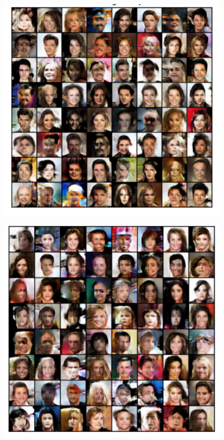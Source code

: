 \documentclass[12pt]{article}
\begin{document}
\begin{figure}[h]
    \centering
    \begin{minipage}{0.45\textwidth}
        \centering
        \includegraphics[width=\textwidth]{15.png} 
        \label{fig:resim1}
    \end{minipage}\hfill
    \begin{minipage}{0.45\textwidth}
        \centering
        \includegraphics[width=\textwidth]{16.png}
        \label{fig:resim2}
    \end{minipage}
\end{figure}
\end{document}
